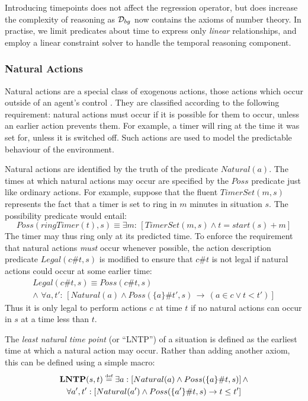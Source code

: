 Introducing timepoints does not affect the regression operator, but
does increase the complexity of reasoning as $\mathcal{D}_{bg}$ now contains
the axioms of number theory. In practise, we limit predicates about
time to express only \emph{linear} relationships, and employ a linear
constraint solver to handle the temporal reasoning component.


\subsubsection{Natural Actions\label{sub:Background:Natural-Actions}}

Natural actions are a special class of exogenous actions, those actions
which occur outside of an agent's control \citep{reiter96sc_nat_conc}.
They are classified according to the following requirement: natural
actions must occur if it is possible for them to occur, unless an
earlier action prevents them. For example, a timer will ring at the
time it was set for, unless it is switched off. Such actions are used
to model the predictable behaviour of the environment.

Natural actions are identified by the truth of the predicate $Natural(a)$.
The times at which natural actions may occur are specified by the
$Poss$ predicate just like ordinary actions. For example, suppose
that the fluent $TimerSet(m,s)$ represents the fact that a timer
is set to ring in $m$ minutes in situation $s$. The possibility
predicate would entail:\[
Poss(ringTimer(t),s)\equiv\exists m:\,\left[TimerSet(m,s)\wedge t=start(s)+m\right]\]
 The timer may thus ring only at its predicted time. To enforce the
requirement that natural actions \emph{must} occur whenever possible,
the action description predicate $Legal(c\#t,s)$ is modified to ensure
that $c\#t$ is not legal if natural actions could occur at some earlier
time:\begin{multline*}
Legal(c\#t,s)\equiv Poss(c\#t,s)\\
\wedge\,\,\forall a,t':\,\left[Natural(a)\wedge Poss(\{a\}\#t',s)\,\rightarrow\,\left(a\in c\vee t<t'\right)\right]\end{multline*}
 Thus it is only legal to perform actions $c$ at time $t$ if no
natural actions can occur in $s$ at a time less than $t$.

The \emph{least natural time point} (or {}``LNTP'') of a situation
is defined as the earliest time at which a natural action may occur.
Rather than adding another axiom, this can be defined using a simple
macro: \begin{multline*}
\mathbf{LNTP}(s,t)\stackrel{\mbox{\tiny def}}{=}\exists a:\left[Natural(a)\wedge Poss(\{a\}\#t,s)\right]\wedge\\
\forall a',t':\left[Natural(a')\wedge Poss(\{a'\}\#t,s)\rightarrow t\leq t'\right]\end{multline*}


